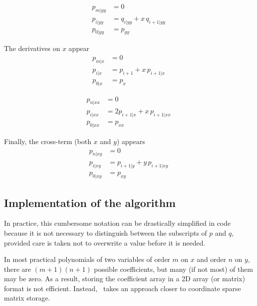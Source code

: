 \begin{subequations}
\begin{align}
p_{m|yy} &= 0\\
p_{i|yy} &= q_{i|yy} + x\,q_{i+1|yy}\\
p_{0|yy} &= p_{yy}
\end{align}
\end{subequations}

The derivatives on $x$ appear
\begin{subequations}
\begin{align}
p_{m|x} &= 0\\
p_{i|x} &= p_{i+1} + x\,p_{i+1|x}\\
p_{0|x} &= p_x
\end{align}
\end{subequations}

\begin{subequations}
\begin{align}
p_{n|xx} &= 0\\
p_{i|xx} &= 2 p_{i+1|x} + x\,p_{i+1|xx}\\
p_{0|xx} &= p_{xx}
\end{align}
\end{subequations}

Finally, the cross-term (both $x$ and $y$) appears
\begin{subequations}
\begin{align}
p_{n|xy} &= 0\\
p_{i|xy} &= p_{i+1|y} + y\,p_{i+1|xy}\\
p_{0|xy} &= p_{xy}
\end{align}
\end{subequations}

\subsection{Implementation of the algorithm}
In practice, this cumbersome notation can be drastically simplified in code because it is not necessary to distinguish between the subscripts of $p$ and $q$, provided care is taken not to overwrite a value before it is needed.

In most practical polynomials of two variables of order $m$ on $x$ and order $n$ on $y$, there are $(m+1)(n+1)$ possible coefficients, but many (if not most) of them may be zero.  As a result, storing the coefficient array in a 2D array (or matrix) format is not efficient.  Instead, \PM\ takes an approach closer to coordinate sparse matrix storage.

